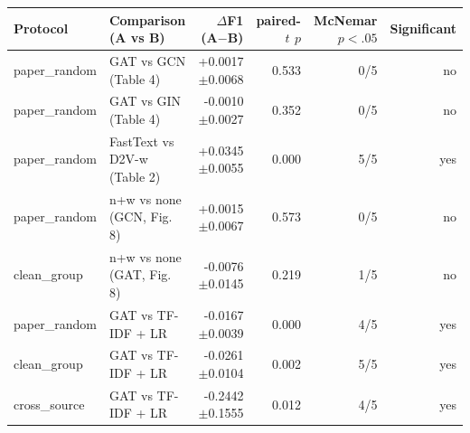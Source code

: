 \begin{tabular}{@{}llrrrr@{}}
\toprule
Protocol & Comparison (A vs B) & $\Delta$F1 (A$-$B) & paired-$t$ $p$ & McNemar $p<.05$ & Significant \\ \midrule
paper\_random & GAT vs GCN (Table 4) & +0.0017$\pm$0.0068 & 0.533 & 0/5 & no \\
paper\_random & GAT vs GIN (Table 4) & -0.0010$\pm$0.0027 & 0.352 & 0/5 & no \\
paper\_random & FastText vs D2V-w (Table 2) & +0.0345$\pm$0.0055 & 0.000 & 5/5 & yes \\
paper\_random & n+w vs none (GCN, Fig. 8) & +0.0015$\pm$0.0067 & 0.573 & 0/5 & no \\
clean\_group & n+w vs none (GAT, Fig. 8) & -0.0076$\pm$0.0145 & 0.219 & 1/5 & no \\
paper\_random & GAT vs TF-IDF + LR & -0.0167$\pm$0.0039 & 0.000 & 4/5 & yes \\
clean\_group & GAT vs TF-IDF + LR & -0.0261$\pm$0.0104 & 0.002 & 5/5 & yes \\
cross\_source & GAT vs TF-IDF + LR & -0.2442$\pm$0.1555 & 0.012 & 4/5 & yes \\
\bottomrule
\end{tabular}
